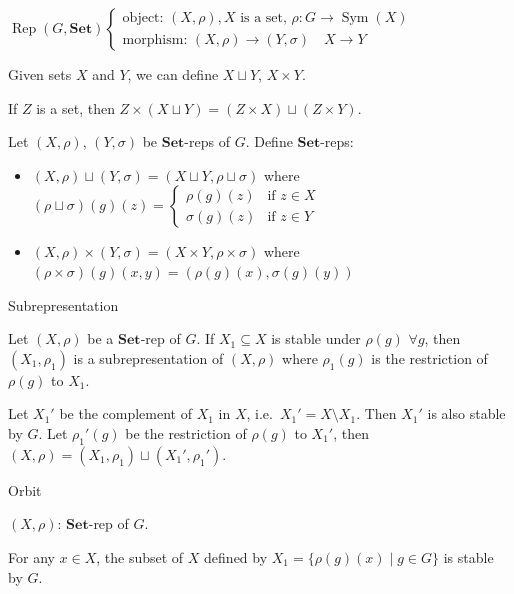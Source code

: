 \documentclass[11pt, a4paper]{report}
\begin{document}
\begin{definition}
$\operatorname{Rep}(G, \mathbf{Set}) \left\{\begin{array}{l}
\text{object: } (X, \rho), X \text{ is a set, } \rho: G \rightarrow \operatorname{Sym}(X) \\
\text{morphism: } (X, \rho) \rightarrow (Y, \sigma) \quad X \rightarrow Y
\end{array}\right.$

Given sets $X$ and $Y$, we can define $X \sqcup Y$, $X \times Y$.

If $Z$ is a set, then $Z \times (X \sqcup Y) = (Z \times X) \sqcup (Z \times Y)$.

Let $(X, \rho)$, $(Y, \sigma)$ be $\mathbf{Set}$-reps of $G$. Define $\mathbf{Set}$-reps:
\begin{itemize}
\item $(X, \rho) \sqcup (Y, \sigma) = (X \sqcup Y, \rho \sqcup \sigma)$ where $(\rho \sqcup \sigma)(g)(z) = \begin{cases} \rho(g)(z) & \text{if } z \in X \\ \sigma(g)(z) & \text{if } z \in Y \end{cases}$
\item $(X, \rho) \times (Y, \sigma) = (X \times Y, \rho \times \sigma)$ where $(\rho \times \sigma)(g)(x, y) = (\rho(g)(x), \sigma(g)(y))$
\end{itemize}
\end{definition}

\begin{definition}
Subrepresentation

Let $(X, \rho)$ be a $\mathbf{Set}$-rep of $G$. If $X_{1} \subseteq X$ is stable under $\rho(g)$ $\forall g$, then $(X_{1}, \rho_{1})$ is a subrepresentation of $(X, \rho)$ where $\rho_{1}(g)$ is the restriction of $\rho(g)$ to $X_{1}$.

Let $X_{1}'$ be the complement of $X_{1}$ in $X$, i.e.\ $X_{1}' = X \setminus X_{1}$. Then $X_{1}'$ is also stable by $G$. Let $\rho_{1}'(g)$ be the restriction of $\rho(g)$ to $X_{1}'$, then $(X, \rho) = (X_{1}, \rho_{1}) \sqcup (X_{1}', \rho_{1}')$.
\end{definition}

\begin{example}
Orbit

$(X, \rho)$: $\mathbf{Set}$-rep of $G$.

For any $x \in X$, the subset of $X$ defined by $X_{1} = \{\rho(g)(x) \mid g \in G\}$ is stable by $G$.
\end{example}
\end{document}
